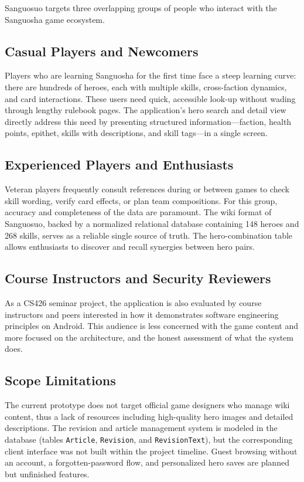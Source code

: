 Sanguosuo targets three overlapping groups of people who interact with the Sanguosha game ecosystem.

\subsection{Casual Players and Newcomers}

Players who are learning Sanguosha for the first time face a steep learning curve: there are hundreds of heroes, each with multiple skills, cross-faction dynamics, and card interactions. These users need quick, accessible look-up without wading through lengthy rulebook pages. The application's hero search and detail view directly address this need by presenting structured information---faction, health points, epithet, skills with descriptions, and skill tags---in a single screen.

\subsection{Experienced Players and Enthusiasts}

Veteran players frequently consult references during or between games to check skill wording, verify card effects, or plan team compositions. For this group, accuracy and completeness of the data are paramount. The wiki format of Sanguosuo, backed by a normalized relational database containing 148 heroes and 268 skills, serves as a reliable single source of truth. The hero-combination table allows enthusiasts to discover and recall synergies between hero pairs.

\subsection{Course Instructors and Security Reviewers}

As a CS426 seminar project, the application is also evaluated by course instructors and peers interested in how it demonstrates software engineering principles on Android. This audience is less concerned with the game content and more focused on the architecture, and the honest assessment of what the system does.

\subsection{Scope Limitations}

The current prototype does not target official game designers who manage wiki content, thus a lack of resources including high-quality hero images and detailed descriptions. The revision and article management system is modeled in the database (tables \texttt{Article}, \texttt{Revision}, and \texttt{RevisionText}), but the corresponding client interface was not built within the project timeline. Guest browsing without an account, a forgotten-password flow, and personalized hero saves are planned but unfinished features.
